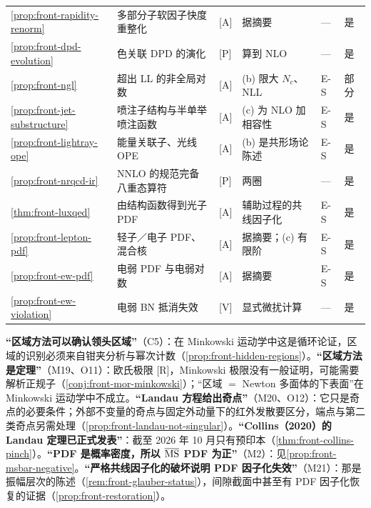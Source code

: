 \begin{table}[htbp]
\begin{tabularx}{\textwidth}{@{}p{1.75cm}>{\raggedright\arraybackslash}Xp{1.35cm}>{\raggedright\arraybackslash}p{3.6cm}p{0.75cm}p{0.95cm}@{}}
\cref{prop:front-rapidity-renorm} & 多部分子软因子快度重整化 & [A] & 据摘要 & — & 是 \\
\cref{prop:front-dpd-evolution} & 色关联 DPD 的演化 & [P] & 算到 NLO & — & 是 \\
\cref{prop:front-ngl} & 超出 LL 的非全局对数 & [A] & (b) 限大 $N_c$、NLL & E-S & 部分 \\
\cref{prop:front-jet-substructure} & 喷注子结构与半单举喷注函数 & [A] & (c) 为 NLO 加相容性 & E-S & 是 \\
\cref{prop:front-lightray-ope} & 能量关联子、光线 OPE & [A] & (b) 是共形场论陈述 & E-S & 是 \\
\cref{prop:front-nrqcd-ir} & NNLO 的规范完备八重态算符 & [P] & 两圈 & — & 是 \\
\cref{thm:front-luxqed} & 由结构函数得到光子 PDF & [A] & 辅助过程的共线因子化 & E-S & 是 \\
\cref{prop:front-lepton-pdf} & 轻子／电子 PDF、混合核 & [A] & 据摘要；(c) 有限阶 & E-S & 是 \\
\cref{prop:front-ew-pdf} & 电弱 PDF 与电弱对数 & [A] & 据摘要 & E-S & 是 \\
\cref{prop:front-ew-violation} & 电弱 BN 抵消失效 & [V] & 显式微扰计算 & — & 是 \\
\bottomrule
\end{tabularx}
\end{table}

\begin{tcolorbox}[enhanced,breakable,title=本章澄清的常见误解,fonttitle=\bfseries,
  colback=gray!3!white,colframe=gray!55!black,boxrule=0.6pt,arc=2pt,
  left=5pt,right=5pt,top=3pt,bottom=3pt,before skip=6pt,after skip=6pt]
\textbf{“区域方法可以确认领头区域”}（C5）：在 Minkowski 运动学中这是循环论证，区域的识别必须来自钳夹分析与幂次计数（\cref{prop:front-hidden-regions}）。\textbf{“区域方法是定理”}（M19、O11）：欧氏极限 [R]，Minkowski 极限没有一般证明，可能需要解析正规子（\cref{conj:front-mor-minkowski}）；“区域 $=$ Newton 多面体的下表面”在 Minkowski 运动学中不成立。\textbf{“Landau 方程给出奇点”}（M20、O12）：它只是奇点的必要条件；外部不变量的奇点与固定外动量下的红外发散要区分，端点与第二类奇点另需处理（\cref{prop:front-landau-not-singular}）。\textbf{“Collins（2020）的 Landau 定理已正式发表”}：截至 2026 年 10 月只有预印本（\cref{thm:front-collins-pinch}）。\textbf{“PDF 是概率密度，所以 $\overline{\mathrm{MS}}$ PDF 为正”}（M2）：见\cref{prop:front-msbar-negative}。\textbf{“严格共线因子化的破坏说明 PDF 因子化失效”}（M21）：那是振幅层次的陈述（\cref{rem:front-glauber-status}），间隙截面中甚至有 PDF 因子化恢复的证据（\cref{prop:front-restoration}）。
\end{tcolorbox}

